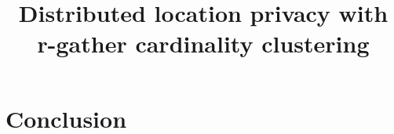 \documentclass[conference]{IEEEtran}
\title{Distributed location privacy with r-gather cardinality clustering}
\begin{document}
\maketitle


\begin{abstract}

\end{abstract} 






\vspace*{-3mm}

\section{Conclusion}




\begin{small}


\end{small}
\end{document}
